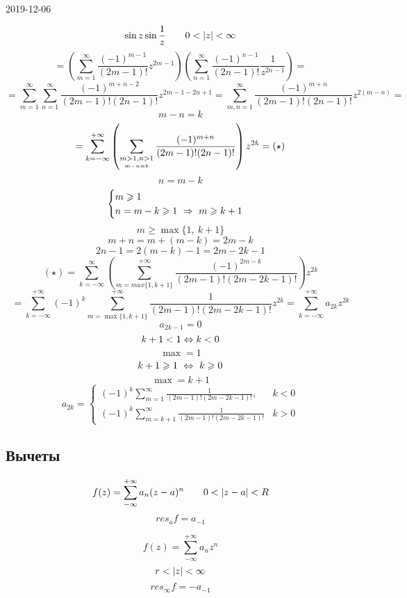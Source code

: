 \documentclass[main]{subfiles}
\begin{document}
\begin{lect}{2019-12-06}
    \begin{Task}[2]
        \[\sin z \sin \frac{1}{z} \qquad 0 < \left|z\right| < \infty\]
        \[= \left(\sum_{m = 1}^\infty \frac{(-1)^{m - 1} }{(2m - 1)!} z^{2m - 1}  \right) 
        \left(\sum_{n = 1}^\infty \frac{(-1)^{n - 1} }{(2n - 1)!} \frac{1}{z^{2n - 1} } \right) = \]
        \[= \sum_{m = 1}^\infty \sum_{n = 1}^\infty \frac{(-1)^{m + n - 2} }{(2m - 1)!(2n - 1)!}
        z^{2m - 1 - 2n + 1} = \sum_{m,n = 1}^\infty \frac{(-1)^{m + n} }{(2m - 1)!(2n - 1)!}z^{2(m - n)} = \]
        \[m - n = k\]
        \[= \sum_{k = -\infty}^{+\infty} \left(\sum_{\underset{ m - n = k}{m > 1, n > 1}} 
        \frac{(-1)^{m + n} }{(2m - 1)!(2n - 1)!}\right)z^{2k}  = (\star) \]
        \[n = m - k\]
        \[\begin{cases}
            m \geqslant 1\\
            n = m - k \geqslant 1 \ \Rightarrow\ m \geqslant k + 1
        \end{cases}\]
        \[m \geq \max\{1,\ k + 1\}\]
        \[m + n = m + (m - k) = 2m - k\]
        \[2n - 1= 2(m - k) - 1 = 2m - 2k - 1\]
        \[(\star) = \sum_{k = -\infty}^{\infty} \left(\sum_{m = max\{1, k+1\}}^{+\infty}
        \frac{(-1)^{2m - k} }{(2m - 1)!(2m - 2k - 1)!}\right)z^{2k}   \]
        \[=\sum_{k = -\infty}^{+\infty} (-1)^k \sum_{m = \max \{1, k + 1\}}^{+\infty} 
        \frac{1}{(2m - 1)!(2m - 2k - 1)!}z^{2k} = \sum_{k = -\infty}^{+\infty} a_{2k}z^{2k}     \]
        \[a_{2k - 1} = 0 \]
        \[k + 1 < 1 \Leftrightarrow k < 0\]
        \[\max = 1\]
        \[k + 1 \geqslant 1 \ \Leftrightarrow \ k \geqslant 0\]
        \[\max = k + 1\]
        \[a_{2k} = \begin{cases}\displaystyle 
            (-1)^k \sum_{m = 1}^\infty \frac{1}{(2m - 1)!(2m - 2k - 1)!}, & k < 0\\
            \displaystyle 
            (-1)^k \sum_{m = k + 1}^\infty \frac{1}{(2m - 1)!(2m - 2k - 1)!} & k > 0 
        \end{cases} \]
    \end{Task}

    \subsection{Вычеты}

    \begin{Definition}
        \[f(z) = \sum_{-\infty}^{+\infty}a_n(z - a)^n \qquad 0 < \left|z - a\right| < R   \]
        \[res_af = a_{-1} \]

        \[f(z) = \sum_{-\infty}^{+\infty} a_n z^n \]
        \[r < \left|z\right| < \infty\]
        \[res_{\infty} f = -a_{-1}  \]
    \end{Definition}


\end{lect}
\end{document}
